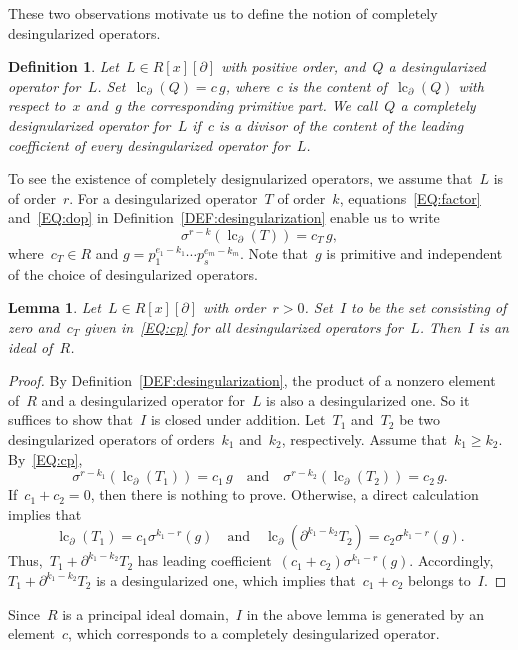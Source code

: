 \documentclass{sig-alternate}
\newcommand{\lc}{\operatorname{lc}}
\newcommand{\si} { {\sigma}}
\newcommand{\pa}{\partial}
\newtheorem{lemma}[theorem]{Lemma}
\newtheorem{definition}[theorem]{Definition}
\begin{document}
These two observations motivate us to define the notion of completely desingularized operators.
\begin{definition} \label{DEF:cd}
Let~$L \in R[x][\pa]$ with positive order, and~$Q$ a desingularized operator for~$L$.
Set~$\lc_\pa(Q)=c \, g$,  where~$c$ is the content of~$\lc_\pa(Q)$ with respect to~$x$ and~$g$
the corresponding primitive part. We call~$Q$ a {\em completely designularized operator} for~$L$
if~$c$ is a divisor of the content of the leading coefficient of every desingularized
operator for~$L$.
\end{definition}

To see the existence of completely designularized operators, we assume that~$L$ is of order~$r$.
For a desingularized operator~$T$ of order~$k$, equations~\eqref{EQ:factor} and~\eqref{EQ:dop} in Definition~\ref{DEF:desingularization} enable us to write
\begin{equation} \label{EQ:cp}
\sigma^{r - k}\left(\lc_\pa(T)\right) = c_T \, g,
\end{equation}
where~$c_T \in R$ and $g = p_1^{e_1-k_1} \cdots p_s^{e_m-k_m}.$ Note that~$g$ is primitive and independent of the choice
of desingularized operators.
\begin{lemma} \label{LM:ideal}
Let~$L \in R[x][\pa]$ with order~$r >0$.
Set~$I$ to be the set consisting of zero and~$c_T$ given in~\eqref{EQ:cp} for all desingularized
operators for~$L$. Then~$I$ is an ideal of~$R$.
\end{lemma}
\begin{proof}
By Definition~\ref{DEF:desingularization}, the product of a nonzero element of~$R$ and a desingularized operator for~$L$
is also a desingularized one. So it suffices to show that~$I$ is closed under addition.
Let~$T_1$ and~$T_2$ be two desingularized operators of orders~$k_1$ and~$k_2$, respectively. Assume that~$k_1 \ge k_2$.
By~\eqref{EQ:cp},
\[ \sigma^{r - k_1}\left(\lc_\pa(T_1)\right) = c_1 \, g \quad \text{and} \quad
\sigma^{r - k_2}\left(\lc_\pa(T_2)\right) = c_2 \, g. \]
If~$c_1+c_2=0$, then there is nothing to prove. Otherwise,
a direct calculation implies that
\[ \lc_\pa(T_1) = c_1 \si^{k_1-r}(g) \quad \text{and} \quad \lc_\pa\left(\pa^{k_1-k_2} T_2\right) = c_2 \si^{k_1-r}(g). \]
Thus,~$T_1+\pa^{k_1-k_2}T_2$ has leading coefficient~$(c_1+c_2) \si^{k_1-r}(g).$
Accordingly,~$T_1+\pa^{k_1-k_2}T_2$
is  a desingularized one, which implies that~$c_1 + c_2$ belongs to~$I$.
\end{proof}
Since~$R$ is a principal ideal domain,~$I$ in the above lemma is generated by an element~$c$, which corresponds to
a completely desingularized operator.
\end{document}
